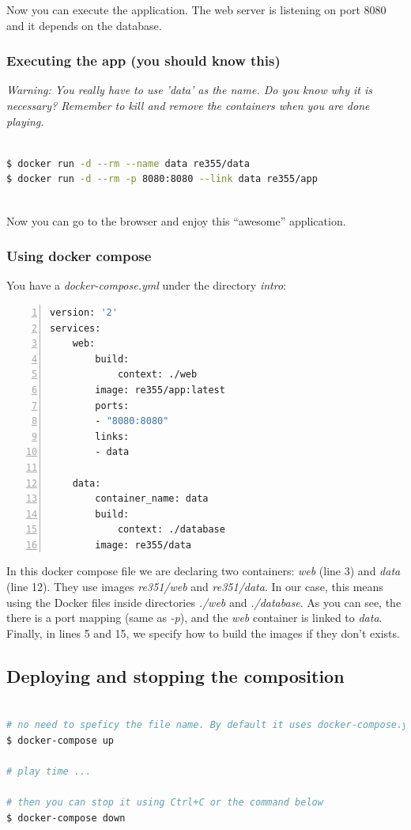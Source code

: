 \documentclass[a4paper,11pt]{exam}
\begin{document}
Now you can execute the application. The web server is listening on port 8080 and it depends on the database.

\subsubsection*{Executing the app (you should know this)}
\textit{Warning: You really have to use 'data' as the name. Do you know why it is necessary? Remember to kill and remove the containers when you are done playing.}

\begin{lstlisting}[frame=single,language={sh}]  % Start your code-block

$ docker run -d --rm --name data re355/data
$ docker run -d --rm -p 8080:8080 --link data re355/app 
      
\end{lstlisting}

Now you can go to the browser and enjoy this ``awesome'' application.

\subsubsection*{Using docker compose}
You have a \textit{docker-compose.yml} under the directory \textit{intro}:
\begin{lstlisting}[frame=single,language={sh}, tabsize=2, numbers=left]  
version: '2'
services:
	web:
		build:
			context: ./web
		image: re355/app:latest
		ports:
		- "8080:8080"
		links:
		- data

	data:
		container_name: data
		build:
			context: ./database
		image: re355/data       
\end{lstlisting}

In this docker compose file we are declaring two containers: \textit{web} (line 3) and \textit{data} (line 12).
They use images \textit{re351/web} and \textit{re351/data}.
In our case, this means using the Docker files inside directories \textit{./web} and \textit{./database}.
As you can see, the there is a port mapping (same as \textit{-p}), and the \textit{web} container is linked to \textit{data}.
Finally, in lines 5 and 15, we specify how to build the images if they don't exists. 

\subsection*{Deploying and stopping the composition}
\begin{lstlisting}[frame=single,language={sh}] % Start your code-block

# no need to speficy the file name. By default it uses docker-compose.yml.
$ docker-compose up

# play time ...

# then you can stop it using Ctrl+C or the command below
$ docker-compose down
\end{lstlisting}
\end{document}
